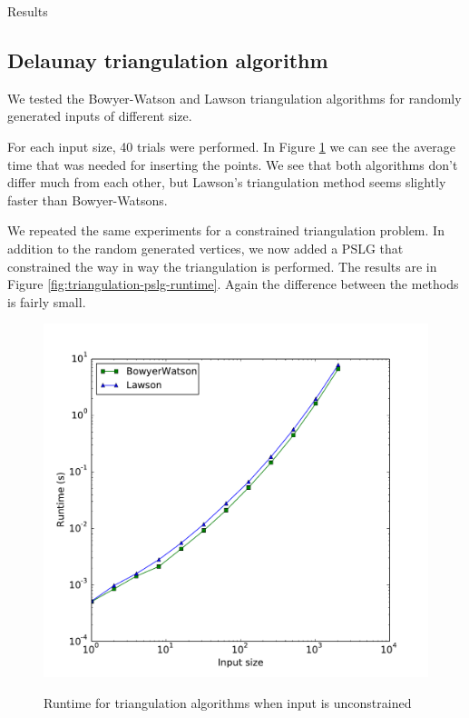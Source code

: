 {Results}
\label{sec:results}

\subsection{Delaunay triangulation algorithm}
\label{sub:results:triangulation}

We tested the Bowyer-Watson and Lawson triangulation algorithms for randomly generated inputs of different size.

For each input size, 40 trials were performed.
In Figure \ref{fig:triangulation-runtime} we can see the average time that was needed for inserting the points.
We see that both algorithms don't differ much from each other, but Lawson's triangulation method seems slightly faster than Bowyer-Watsons.


We repeated the same experiments for a constrained triangulation problem.
In addition to the random generated vertices, we now added a PSLG that constrained the way in way the triangulation is performed.
The results are in Figure \ref{fig:triangulation-pslg-runtime}.
Again the difference between the methods is fairly small.

\begin{figure}[ht]
    \centering
    \includegraphics[width=\columnwidth]{../images/runtime.pdf}
    \label{fig:triangulation-runtime}
    \caption{Runtime for triangulation algorithms when input is unconstrained}
\end{figure}

